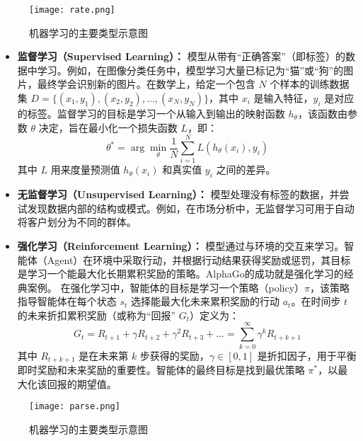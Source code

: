 \begin{figure}[H]
    \centering
    \texttt{[image: rate.png]} 
    \caption{机器学习的主要类型示意图}
    \label{fig:rate}
\end{figure}

\begin{itemize}
    \item \textbf{监督学习（Supervised Learning）：}\cite{lecun2015deep} 模型从带有“正确答案”（即标签）的数据中学习。例如，在图像分类任务中，模型学习大量已标记为“猫”或“狗”的图片，最终学会识别新的图片。在数学上，给定一个包含 $N$ 个样本的训练数据集 $D = \{(x_1, y_1), (x_2, y_2), \dots, (x_N, y_N)\}$，其中 $x_i$ 是输入特征，$y_i$ 是对应的标签。监督学习的目标是学习一个从输入到输出的映射函数 $h_{\theta}$，该函数由参数 $\theta$ 决定，旨在最小化一个损失函数 $L$，即：
    $$ \theta^* = \arg\min_{\theta} \frac{1}{N} \sum_{i=1}^{N} L(h_{\theta}(x_i), y_i) $$
  其中 $L$ 用来度量预测值 $h_{\theta}(x_i)$ 和真实值 $y_i$ 之间的差异。
    \item \textbf{无监督学习（Unsupervised Learning）：}\cite{glielmo2021unsupervised} 模型处理没有标签的数据，并尝试发现数据内部的结构或模式。例如，在市场分析中，无监督学习可用于自动将客户划分为不同的群体。
    \item \textbf{强化学习（Reinforcement Learning）：}\cite{matsuo2022deep} 模型通过与环境的交互来学习。智能体（Agent）在环境中采取行动，并根据行动结果获得奖励或惩罚，其目标是学习一个能最大化长期累积奖励的策略。AlphaGo的成功就是强化学习的经典案例。
    在强化学习中，智能体的目标是学习一个策略（policy）$\pi$，该策略指导智能体在每个状态 $s_t$ 选择能最大化未来累积奖励的行动 $a_t$。在时间步 $t$ 的未来折扣累积奖励（或称为“回报” $G_t$）定义为：
    $$ G_t = R_{t+1} + \gamma R_{t+2} + \gamma^2 R_{t+3} + \dots = \sum_{k=0}^{\infty} \gamma^k R_{t+k+1} $$
    其中 $R_{t+k+1}$ 是在未来第 $k$ 步获得的奖励，$\gamma \in [0, 1]$ 是折扣因子，用于平衡即时奖励和未来奖励的重要性。智能体的最终目标是找到最优策略 $\pi^*$，以最大化该回报的期望值。
\end{itemize}

\begin{figure}[H]
    \centering
    \texttt{[image: parse.png]} 
    \caption{机器学习的主要类型示意图}
    \label{fig:parse}
\end{figure}

